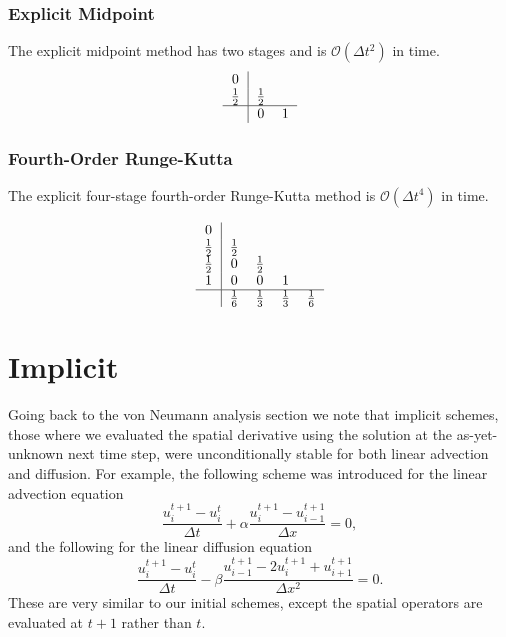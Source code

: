 \subsubsection{Explicit Midpoint}
The explicit midpoint method has two stages and is $\mathcal{O}(\Delta t^2)$ in time.
\begin{equation}
	\begin{tabular}{c|ccccc}
	0   & \\
	$\frac{1}{2}$   & $\frac{1}{2}$ \\
	\hline
	         & 0 & 1\\
	\end{tabular}
\end{equation}


\subsubsection{Fourth-Order Runge-Kutta}
The explicit four-stage fourth-order Runge-Kutta method is $\mathcal{O}(\Delta t^4)$ in time.

\begin{equation}
	\begin{tabular}{c|ccccc}
	0   & \\
	$\frac{1}{2}$   & $\frac{1}{2}$ \\
	$\frac{1}{2}$   & 0 & $\frac{1}{2}$ \\
	$1$   & 0 & 0 & 1 \\
	\hline
	         & $\frac{1}{6}$ & $\frac{1}{3}$ & $\frac{1}{3}$ & $\frac{1}{6}$\\
	\end{tabular}
\end{equation}

\section{Implicit}
Going back to the von Neumann analysis section we note that implicit schemes, those where we evaluated the spatial derivative using the solution at the as-yet-unknown next time step, were unconditionally stable for both linear advection and diffusion. For example, the following scheme was introduced for the linear advection equation
\begin{equation}
	\frac{u_i^{t+1} - u_{i}^t}{\Delta t} +  \alpha \frac{u_i^{t+1} - u_{i-1}^{t+1}}{\Delta x} = 0,
\end{equation}
and the following for the linear diffusion equation
\begin{equation}
  \frac{u_i^{t+1} - u_{i}^t}{\Delta t} - \beta \frac{u_{i-1}^{t+1} - 2u_i^{t+1} + u_{i+1}^{t+1}}{\Delta x^2} = 0.
\end{equation}
These are very similar to our initial schemes, except the spatial operators are evaluated at $t+1$ rather than $t$.

